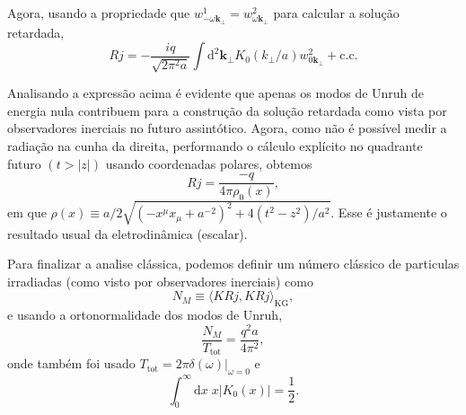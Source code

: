 \documentclass[12pt]{article}
\newcommand{\dd}{\mathrm{d}}
\newcommand{\innerkg}[2]{\langle#1,#2\rangle_{\text{KG}}}
\newcommand{\Ttot}{T_{\text{tot}}}
\newcommand{\wu}[1]{w^1_{#1\mathbf{k}_\perp}}
\newcommand{\wv}[1]{w^2_{#1\mathbf{k}_\perp}}
\begin{document}
Agora, usando a propriedade que \(\wu{-\omega}=\wv{\omega}\) para calcular a solução retardada,
\begin{equation}
    Rj=-\frac{iq}{\sqrt{2\pi^2a}}\int\dd^2\mathbf{k}_\perp K_0(k_\perp/a)\wv{0}+\text{c.c.}
\end{equation}

Analisando a expressão acima é evidente que apenas os modos de Unruh de energia nula contribuem para a construção da solução retardada como vista por observadores inerciais no futuro assintótico. Agora, como não é possível medir a radiação na cunha da direita\cite{boulware}, performando o cálculo explícito no quadrante futuro \((t>\lvert z\rvert)\) usando coordenadas polares, obtemos
\begin{equation}
    Rj=\frac{-q}{4\pi\rho_0(x)},
\end{equation}
em que \(\rho(x)\equiv a/2\sqrt{(-x^\mu x_\mu+a^{-2})^2+4(t^2-z^2)/a^2}\). Esse é justamente o resultado usual da eletrodinâmica (escalar)\cite{ren}.

Para finalizar a analise clássica, podemos definir um número clássico de particulas irradiadas (como visto por observadores inerciais) como
\begin{equation}
    N_M\equiv\innerkg{KRj}{KRj},
\end{equation}
e usando a ortonormalidade dos modos de Unruh,
\begin{equation}
    \frac{N_M}{\Ttot}=\frac{q^2a}{4\pi^2},
\end{equation}
onde também foi usado \(\Ttot=2\pi\delta(\omega)\vert_{\omega=0}\) e 
\begin{equation}
    \int_0^{\infty}\dd x\;x\lvert K_0(x)\rvert=\frac{1}{2}.
\end{equation}
\end{document}
